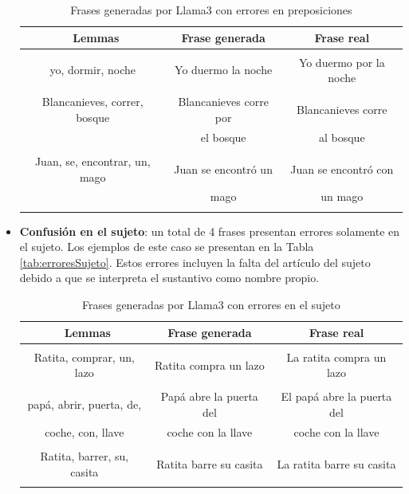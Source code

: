 \documentclass[11pt,spanish,listoffigures,listoftables]{tfgetsinf}
\begin{document}
\begin{itemize}
\begin{table}[!h]
\caption{Frases generadas por Llama3 con errores en preposiciones}
\begin{center}
\begin{tabular}{ c | c | c }
	\ Lemmas & Frase generada & Frase real \\
	\hline
	\hline
	 & & \\
	yo, dormir, noche & Yo duermo la noche & Yo duermo por la noche \\
	 & & \\
	Blancanieves, correr, bosque & Blancanieves corre por  & Blancanieves corre \\
	 & el bosque & al bosque \\
	 & & \\
	Juan, se, encontrar, un, mago & Juan se encontró un  & Juan se encontró con \\
	 & mago & un mago \\
	 & & \\

\end{tabular}
\end{center}
\label{tab:erroresPreposicion}
\end{table}

	\item \textbf{Confusión en el sujeto}: un total de 4 frases presentan errores solamente en el sujeto. Los ejemplos de este caso se presentan en la Tabla \ref{tab:erroresSujeto}. Estos errores incluyen la falta del artículo del sujeto debido a que se interpreta el sustantivo como nombre propio.

\begin{table}[!h]
\caption{Frases generadas por Llama3 con errores en el sujeto}
\begin{center}
\begin{tabular}{ c | c | c }
	\ Lemmas & Frase generada & Frase real \\
	\hline
	\hline
	 & & \\
	Ratita, comprar, un, lazo & Ratita compra un lazo & La ratita compra un lazo \\
	 & & \\
	papá, abrir, puerta, de,  & Papá abre la puerta del & El papá abre la puerta del \\
	 coche, con, llave & coche con la llave & coche con la llave \\
	 & & \\
	Ratita, barrer, su, casita & Ratita barre su casita & La ratita barre su casita \\
	 & & \\


\end{tabular}
\end{center}
\end{table}
\end{itemize}
\end{document}
